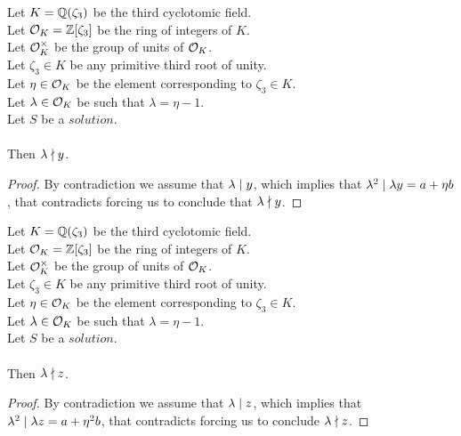 \begin{lemma}
    \label{lmm:lambda_not_dvd_y}
    \leanok
    Let $K = \mathbb{Q}(\zeta_3)$ be the third cyclotomic field. \\
    Let $\mathcal{O}_K = \mathbb{Z}[\zeta_3]$ be the ring of integers of $K$. \\
    Let $\mathcal{O}^\times_K$ be the group of units of $\mathcal{O}_K$. \\
    Let $\zeta_3 \in K$ be any primitive third root of unity. \\
    Let $\eta \in \mathcal{O}_K$ be the element corresponding to $\zeta_3 \in K$. \\
    Let $\lambda \in \mathcal{O}_K$ be such that $\lambda = \eta -1$. \\
    Let $S$ be a $solution$.\\\\
    Then $\lambda \nmid y$.
\end{lemma}
\begin{proof}
    \leanok
    By contradiction we assume that $\lambda \mid y$, which implies that
    $\lambda^2 \mid \lambda y = a + \eta b$, that contradicts
     forcing us to conclude that
    $\lambda \nmid y$.
\end{proof}

\begin{lemma}
    \label{lmm:lambda_not_dvd_z}
    \leanok
    Let $K = \mathbb{Q}(\zeta_3)$ be the third cyclotomic field. \\
    Let $\mathcal{O}_K = \mathbb{Z}[\zeta_3]$ be the ring of integers of $K$. \\
    Let $\mathcal{O}^\times_K$ be the group of units of $\mathcal{O}_K$. \\
    Let $\zeta_3 \in K$ be any primitive third root of unity. \\
    Let $\eta \in \mathcal{O}_K$ be the element corresponding to $\zeta_3 \in K$. \\
    Let $\lambda \in \mathcal{O}_K$ be such that $\lambda = \eta -1$. \\
    Let $S$ be a $solution$.\\\\
    Then $\lambda \nmid z$.
\end{lemma}
\begin{proof}
    \leanok
    By contradiction we assume that $\lambda \mid z$, which implies that
    $\lambda^2 \mid \lambda z = a + \eta^2 b$, that contradicts
     forcing us to conclude $\lambda \nmid z$.
\end{proof}

